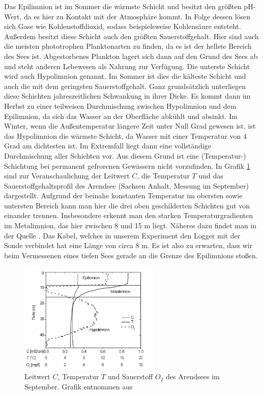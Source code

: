 \documentclass[12pt,a4paper,titlepage,headinclude,bibtotoc]{scrartcl}
\numberwithin{equation}{subsection}
\begin{document}
Das Epilimnion ist im Sommer die wärmste Schicht und besitzt den größten pH-Wert, da es hier zu Kontakt mit der Atmosphäre kommt.
In Folge dessen lösen sich Gase wie Kohlenstoffdioxid, sodass beispielsweise Kohlensäure entsteht.
Außerdem besitzt diese Schicht auch den größten Sauerstoffgehalt.
Hier sind auch die meisten phototrophen Planktonarten zu finden, da es ist der hellste Bereich des Sees ist.
Abgestorbenes Plankton lagert sich dann auf den Grund des Sees ab und steht anderen Lebewesen als Nahrung zur Verfügung.
\newline
Die unterste Schicht wird auch Hypolimnion genannt.
Im Sommer ist dies die kälteste Schicht und auch die mit dem geringsten Sauerstoffgehalt. 
Ganz grundsätzlich unterliegen diese Schichten jahreszeitlichen Schwankung in ihrer Dicke.
Es kommt dann im Herbst zu einer teilweisen Durchmischung zwischen Hypolimnion und dem Epilimnion, da sich das Wasser an der Oberfläche abkühlt und absinkt.
Im Winter, wenn die Außentemperatur längere Zeit unter Null Grad gewesen ist, ist das Hypolimnion die wärmste Schicht, da Wasser mit einer Temperatur von 4 Grad am dichtesten ist. 
Im Extremfall liegt dann eine vollständige Durchmischung aller Schichten vor.
Aus diesem Grund ist eine (Temperatur-) Schichtung bei permanent gefrorenen Gewässern nicht vorzufinden.
\newline
In Grafik \ref{fig:schichtung} sind zur Veranschaulichung der Leitwert $C$, die Temperatur $T$ und das Sauerstoffgehaltsprofil des Arendsee (Sachsen Anhalt, Messung im September) dargestellt. 
Aufgrund der beinahe konstanten Temperatur im obersten sowie untersten Bereich kann man hier die drei oben geschilderten Schichten gut von einander trennen.
Insbesondere erkennt man den starken Temperaturgradienten im Metalimnion, das hier zwischen 8 und 15 m liegt. 
Näheres dazu findet man in der Quelle \cite{schicht}.
Das Kabel, welches in unserem Experiment den Logger mit der Sonde verbindet hat eine Länge von circa 8 m.
Es ist also zu erwarten, dass wir beim Vermessenen eines tiefen Sees gerade an die Grenze des Epilimnions stoßen.


\begin{figure}[h]
	\centering
	\includegraphics[width=0.6\textwidth]{schicht.png}
	\caption{Leitwert $C$, Temperatur $T$ und Sauerstoff $O_2$ des Arendsees im September. Grafik entnommen aus \cite{schicht} }
	\label{fig:schichtung}
\end{figure}
\end{document}
